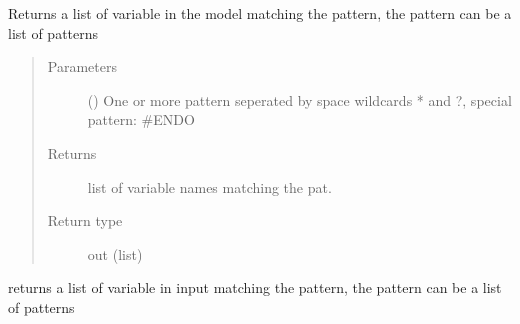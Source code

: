 \documentclass[letterpaper,10pt,english]{sphinxmanual}
\begin{document}
\begin{fulllineitems}

\begin{fulllineitems}
\label{\detokenize{core/modelclass:modelclass.Org_model_Mixin.vlist}}
\pysigstartsignatures
{}
\pysigstopsignatures
\sphinxAtStartPar
Returns a list of variable in the model matching the pattern, the pattern can be a list of patterns
\begin{quote}\begin{description}
\item[{Parameters}] \leavevmode
\sphinxAtStartPar
{} () \textendash{} One or more pattern seperated by space wildcards * and ?, special pattern: \#ENDO

\item[{Returns}] \leavevmode
\sphinxAtStartPar
list of variable names matching the pat.

\item[{Return type}] \leavevmode
\sphinxAtStartPar
out (list)

\end{description}\end{quote}

\end{fulllineitems}


\begin{fulllineitems}
\label{\detokenize{core/modelclass:modelclass.Org_model_Mixin.list_names}}
\pysigstartsignatures
{}
\pysigstopsignatures
\sphinxAtStartPar
returns a list of variable in input  matching the pattern, the pattern can be a list of patterns

\end{fulllineitems}



\end{fulllineitems}
\end{document}
